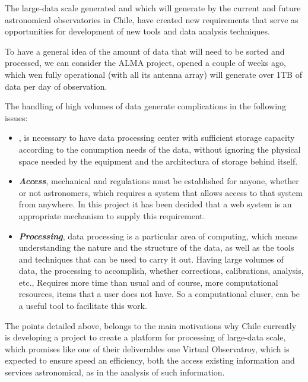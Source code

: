 The large-data scale generated and which will generate by the current and
future astronomical observatories in Chile, have created new requirements that
serve as opportunities for development of new tools and data analysis
techniques.

To have a general idea of the amount of data that will need to be sorted and
processed, we can consider the ALMA project, opened a couple of weeks ago,
which wen fully operational (with all its antenna array) will generate over 1TB
of data per day of observation.

The handling of high volumes of data generate complications in the following
issues:

\begin{itemize}
	\item {}, is necessary to have data processing 
		center with sufficient storage capacity according to the 
		conumption needs of the data, without ignoring the physical 
		space needed by the equipment and the architectura
		of storage behind itself.
	\item \emph{\textbf{Access}}, mechanical and regulations must be 
		established for anyone, whether or not astronomers, which 
		requires a system that allows access to that system from anywhere. 
		In this project it has been decided that a web system is an
		appropriate mechanism to supply this requirement.
	\item \emph{\textbf{Processing}}, data processing is a particular area
		of computing, which means understanding the nature and the 
		structure of the data, as well as the tools and techniques
		that can be used to carry it out. Having large volumes of data,
		the processing to accomplish, whether corrections, calibrations,
		analysis, etc., Requires more time than usual and of course,
		more computational resources, items that a user does not have.
		So a computational cluser, can be a useful tool to facilitate
		this work.
\end{itemize}

The points detailed above, belongs to the main motivations why Chile currently
is developing a project to create a platform for processing of large-data
scale, which promises like one of their deliverables one Virtual Observatroy,
which is expected to ensure speed an efficiency, both the access existing
information and services astronomical, as in the analysis of such information.
